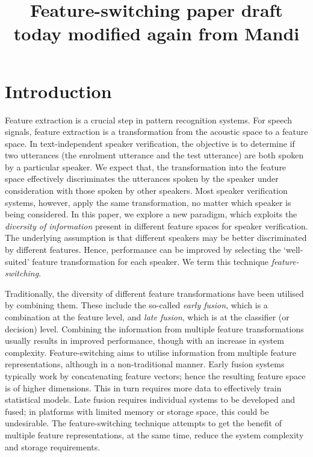 \documentclass{article}
\title{Feature-switching paper draft today modified again from Mandi}
\begin{document}
\section{Introduction}
\label{sec:intro}
Feature extraction is a crucial step in pattern recognition systems. For
speech signals, feature extraction is a transformation from the acoustic space
to a feature space. In text-independent speaker verification, the objective is
to determine if two utterances (the enrolment utterance and the test utterance) are
both spoken by a particular speaker. We expect that, the transformation into the
feature space effectively discriminates the utterances spoken by the speaker
under consideration with those spoken by other speakers. Most speaker
verification systems, however, apply the same transformation, no matter which
speaker is being considered. In this paper, we explore a new paradigm, which
exploits the \emph{diversity of information} present in different feature spaces
for speaker verification. The underlying assumption is that different speakers
may be better discriminated by different features. Hence, performance can
be improved by selecting the `well-suited' feature transformation for
each speaker. We term this technique \emph{feature-switching}. 

Traditionally, the diversity of different feature transformations have been
utilised by combining them. These include the so-called \emph{early fusion},
which is a combination at the feature level, and \emph{late fusion}, which is at
the classifier (or decision) level. Combining the information from multiple
feature transformations usually results in improved performance, though
with an increase in system complexity. Feature-switching aims to utilise
information from multiple feature representations, although in a non-traditional
manner. Early fusion systems typically work by concatenating feature vectors;
hence the resulting feature space is of higher dimensions. This in turn requires
more data to effectively train statistical models. Late fusion requires
individual systems to be developed and fused; in platforms with limited memory or
storage space, this could be undesirable. The feature-switching technique
attempts to get the benefit of multiple feature representations, at the same
time, reduce the system complexity and storage requirements.
\end{document}
